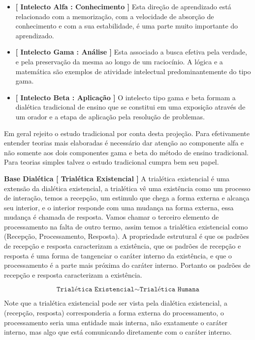 \documentclass[10pt,a4paper]{report}
\begin{document}
\begin{itemize}
	\item[ (i) ] \textbf{[ Intelecto Alfa : Conhecimento ]} Esta direção de aprendizado está relacionado com a memorização, com a velocidade de absorção de conhecimento e com a sua estabilidade, é uma parte muito importante do aprendizado.
	\item[ (ii) ] \textbf{[ Intelecto Gama : Análise ]} Esta associado a busca efetiva pela verdade, e pela preservação da mesma ao longo de um raciocínio. A lógica e a matemática são exemplos de atividade intelectual predominantemente do tipo gama.
	\item[ (iii) ] \textbf{[ Intelecto Beta : Aplicação ]} O intelecto tipo gama e beta formam a dialética tradicional de ensino que se constitui em uma exposição através de um orador e a etapa de aplicação pela resolução de problemas. 
\end{itemize}

Em geral rejeito o estudo tradicional por conta desta projeção. Para efetivamente entender teorias mais elaboradas é necessário dar atenção ao componente alfa e não somente aos dois componentes gama e beta do método de ensino tradicional. Para teorias simples talvez o estudo tradicional cumpra bem seu papel.

\hspace{\baselineskip}

\textbf{Base Dialética [ Trialética Existencial ]} A trialética existencial é uma extensão da dialética existencial, a trialética vê uma existência como um processo de interação, temos a recepção, um estimulo que chega a forma externa e alcança seu interior, e o interior responde com uma mudança na forma externa, essa mudança é chamada de resposta. Vamos chamar o terceiro elemento de processamento na falta de outro termo, assim temos a trialética existencial como (Recepção, Processamento, Resposta). A propriedade estrutural é que os padrões de recepção e resposta caracterizam a existência, que os padrões de recepção e resposta é uma forma de tangenciar o caráter interno da existência, e que o processamento é a parte mais próxima do caráter interno. Portanto os padrões de recepção e resposta caracterizam a existência.

$$ \texttt{Trialética Existencial} \sim \texttt{Trialética Humana} $$

Note que a trialética existencial pode ser vista pela dialética existencial, a (recepção, resposta) corresponderia a forma externa do processamento, o processamento seria uma entidade mais interna, não exatamente o caráter interno, mas algo que está comunicando diretamente com o caráter interno.
\end{document}
